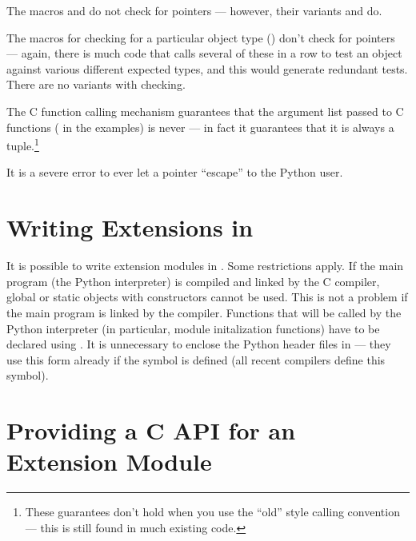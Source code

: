 The macros  and 
do not check for \NULL{} pointers --- however, their variants
 and  do.

The macros for checking for a particular object type
() don't check for \NULL{} pointers ---
again, there is much code that calls several of these in a row to test
an object against various different expected types, and this would
generate redundant tests.  There are no variants with \NULL{}
checking.

The C function calling mechanism guarantees that the argument list
passed to C functions ( in the examples) is never
\NULL{} --- in fact it guarantees that it is always a tuple.\footnote{
These guarantees don't hold when you use the ``old'' style
calling convention --- this is still found in much existing code.}

It is a severe error to ever let a \NULL{} pointer ``escape'' to
the Python user.



\section{Writing Extensions in \Cpp
         \label{cplusplus}}

It is possible to write extension modules in \Cpp.  Some restrictions
apply.  If the main program (the Python interpreter) is compiled and
linked by the C compiler, global or static objects with constructors
cannot be used.  This is not a problem if the main program is linked
by the \Cpp{} compiler.  Functions that will be called by the
Python interpreter (in particular, module initalization functions)
have to be declared using .
It is unnecessary to enclose the Python header files in
 --- they use this form already if the symbol
 is defined (all recent \Cpp{} compilers define this
symbol).


\section{Providing a C API for an Extension Module
         \label{using-cobjects}}

